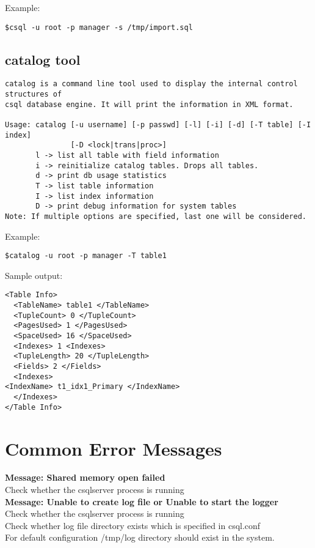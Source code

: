 \documentclass[12pt]{article}
\begin{document}
Example: 
\begin{verbatim}
$csql -u root -p manager -s /tmp/import.sql
\end{verbatim}

\subsection{catalog tool}
\label{catalogtool}
\begin{verbatim}
catalog is a command line tool used to display the internal control structures of 
csql database engine. It will print the information in XML format.

Usage: catalog [-u username] [-p passwd] [-l] [-i] [-d] [-T table] [-I index] 
               [-D <lock|trans|proc>]
       l -> list all table with field information
       i -> reinitialize catalog tables. Drops all tables.
       d -> print db usage statistics
       T -> list table information
       I -> list index information
       D -> print debug information for system tables
Note: If multiple options are specified, last one will be considered.
\end{verbatim}

Example: 
\begin{verbatim}
$catalog -u root -p manager -T table1
\end{verbatim}
Sample output:
\begin{verbatim}
<Table Info> 
  <TableName> table1 </TableName>
  <TupleCount> 0 </TupleCount>
  <PagesUsed> 1 </PagesUsed>
  <SpaceUsed> 16 </SpaceUsed>
  <Indexes> 1 <Indexes>
  <TupleLength> 20 </TupleLength>
  <Fields> 2 </Fields>
  <Indexes>
<IndexName> t1_idx1_Primary </IndexName>
  </Indexes>
</Table Info> 
\end{verbatim}

\section{Common Error Messages}
\label{errormessages}
\textbf {Message: Shared memory open failed}  \\
Check whether the csqlserver process is running \\

\textbf {Message: Unable to create log file or Unable to start the logger}\\
Check whether the csqlserver process is running \\
Check whether log file directory exists which is specified in csql.conf \\
For default configuration /tmp/log directory should exist in the system.

\end{document}
